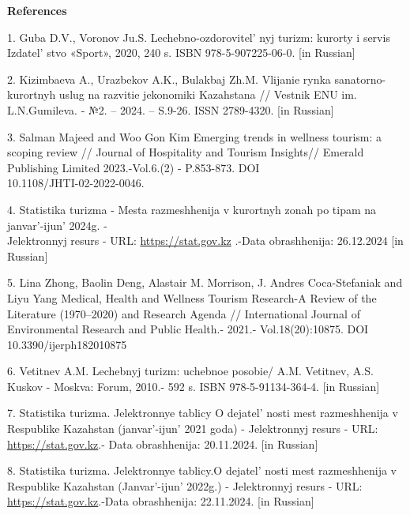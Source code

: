 \begin{center}
{\bfseries References}
\end{center}

\begin{references}
1. Guba D.V., Voronov Ju.S. Lechebno-ozdorovitel' nyj
turizm: kurorty i servis Izdatel' stvo «Sport», 2020, 240
s. ISBN 978-5-907225-06-0. {[}in Russian{]}

2. Kizimbaeva A., Urazbekov A.K., Bulakbaj Zh.M. Vlijanie rynka
sanatorno-kurortnyh uslug na razvitie jekonomiki Kazahstana // Vestnik
ENU im. L.N.Gumileva. - №2. -- 2024. -- S.9-26. ISSN 2789-4320. {[}in
Russian{]}

3. Salman Majeed and Woo Gon Kim Emerging trends in wellness tourism: a
scoping review // Journal of Hospitality and Tourism Insights// Emerald
Publishing Limited 2023.-Vol.6.(2) - P.853-873. DOI\\
10.1108/JHTI-02-2022-0046.

4. Statistika turizma - Mesta razmeshhenija v kurortnyh zonah po tipam
na janvar'-ijun'{} 2024g. - \\Jelektronnyj resurs - URL:
\href{https://stat.gov.kz/ru/industries/business-statistics/stat-tourism/}{https://stat.gov.kz}
.-Data obrashhenija: 26.12.2024 {[}in Russian{]}

5. Lina Zhong, Baolin Deng, Alastair M. Morrison, J. Andres
Coca-Stefaniak and Liyu Yang Medical, Health and Wellness Tourism
Research-A Review of the Literature (1970--2020) and Research
Agenda // International Journal of Environmental Research and Public
Health.- 2021.- Vol.18(20):10875. DOI 10.3390/ijerph182010875

6. Vetitnev A.M. Lechebnyj turizm: uchebnoe posobie/ A.M. Vetitnev, A.S.
Kuskov - Moskva: Forum, 2010.- 592 s. ISBN 978-5-91134-364-4. {[}in
Russian{]}

7. Statistika turizma. Jelektronnye tablicy O
dejatel' nosti mest razmeshhenija v Respublike Kazahstan
(janvar'-ijun'{} 2021 goda) - Jelektronnyj
resurs - URL:
\href{https://stat.gov.kz/ru/industries/business-statistics/stat-tourism/spreadsheets/?year=2021&name}{https://stat.gov.kz}.-
Data obrashhenija: 20.11.2024. {[}in Russian{]}

8. Statistika turizma. Jelektronnye tablicy.O
dejatel' nosti mest razmeshhenija v Respublike Kazahstan
(Janvar'-ijun'{} 2022g.) - Jelektronnyj
resurs - URL:
\href{https://stat.gov.kz/ru/industries/business-statistics/stat-ourism/spreadsheets/?year=2022&name}{https://stat.gov.kz}.-Data
obrashhenija: 22.11.2024. {[}in Russian{]}


\end{references}
